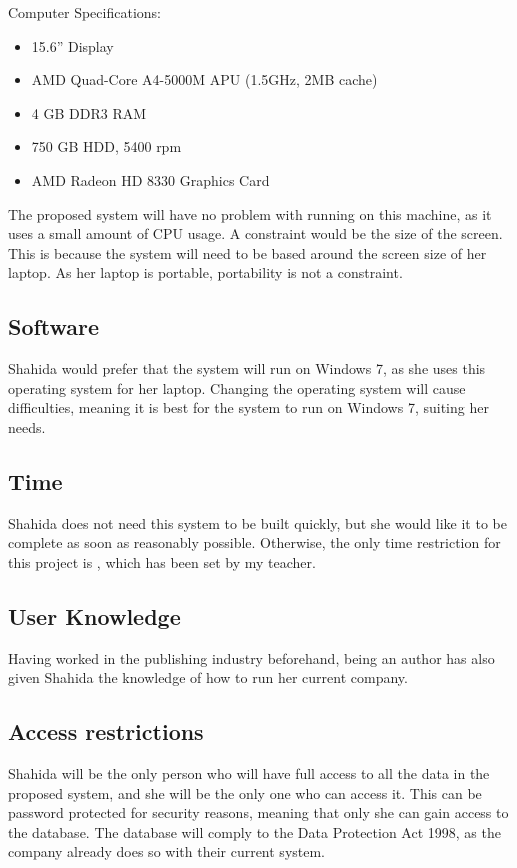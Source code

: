 Computer Specifications:

\begin{itemize}
    \item 15.6” Display
    \item AMD Quad-Core A4-5000M APU (1.5GHz, 2MB cache)
    \item 4 GB DDR3 RAM
    \item 750 GB HDD, 5400 rpm
    \item AMD Radeon HD 8330 Graphics Card
\end{itemize}

The proposed system will have no problem with running on this machine, as it uses a small amount of CPU usage. A constraint would be the size of the screen. This is because the system will need to be based around the screen size of her laptop. As her laptop is portable, portability is not a constraint.

\subsection{Software}

Shahida would prefer that the system will run on Windows 7, as she uses this operating system for her laptop. Changing the operating system will cause difficulties, meaning it is best for the system to run on Windows 7, suiting her needs.

\subsection{Time}

Shahida does not need this system to be built quickly, but she would like it to be complete as soon as reasonably possible. Otherwise, the only time restriction for this project is , which has been set by my teacher.

\subsection{User Knowledge}

Having worked in the publishing industry beforehand, being an author has also given Shahida the knowledge of how to run her current company. 

\subsection{Access restrictions}

Shahida will be the only person who will have full access to all the data in the proposed system, and she will be the only one who can access it. This can be password protected for security reasons, meaning that only she can gain access to the database. The database will comply to the Data Protection Act 1998, as the company already does so with their current system.

